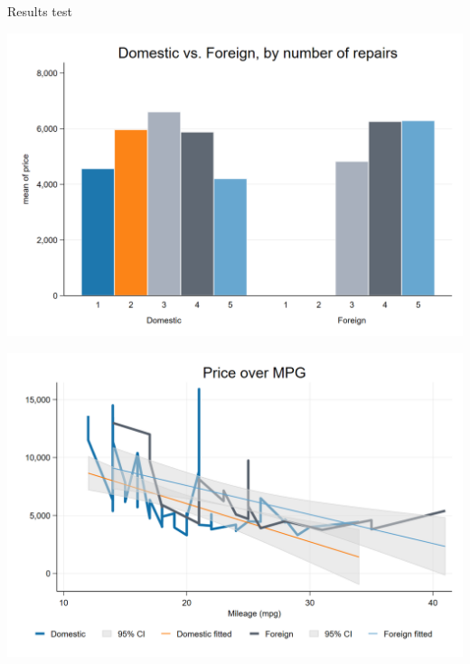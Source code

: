 \documentclass[../main.tex]{subfiles} %
\begin{document}
Results test



\includegraphics[width=1\textwidth]{project/figures/graph_repair_prices.png} %

\includegraphics[width=1\textwidth]{project/figures/graph_twoway.png} %
\end{document}
